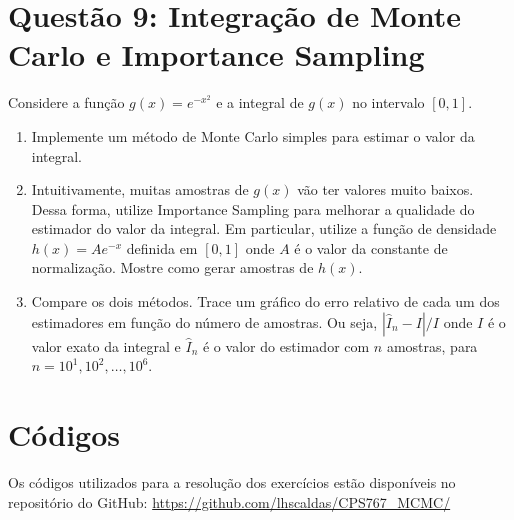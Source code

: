 \documentclass[12 pt]{article}
\begin{document}
\section*{Questão 9: Integração de Monte Carlo e Importance Sampling}

Considere a função $g(x) = e^{-x^2}$ e a integral de $g(x)$ no intervalo $[0, 1]$.

\begin{enumerate}
    \item Implemente um método de Monte Carlo simples para estimar o valor da integral.
    \begin{tcolorbox}[colframe=black, title=Resposta:]

    \end{tcolorbox}
    \item Intuitivamente, muitas amostras de $g(x)$ vão ter valores muito baixos. Dessa forma, utilize Importance Sampling para melhorar a qualidade do estimador do valor da integral. Em particular, utilize a função de densidade $h(x) = Ae^{-x}$ definida em $[0, 1]$ onde $A$ é o valor da constante de normalização. Mostre como gerar amostras de $h(x)$.
    \begin{tcolorbox}[colframe=black, title=Resposta:]

    \end{tcolorbox}
    \item Compare os dois métodos. Trace um gráfico do erro relativo de cada um dos estimadores em função do número de amostras. Ou seja, $|\hat{I}_n - I|/I$ onde $I$ é o valor exato da integral e $\hat{I}_n$ é o valor do estimador com $n$ amostras, para $n = 10^1, 10^2, \dots, 10^6$.
    \begin{tcolorbox}[colframe=black, title=Resposta:]

    \end{tcolorbox}
\end{enumerate}


\section*{Códigos}

Os códigos utilizados para a resolução dos exercícios estão disponíveis no repositório do GitHub: \url{https://github.com/lhscaldas/CPS767_MCMC/}

\end{document}
